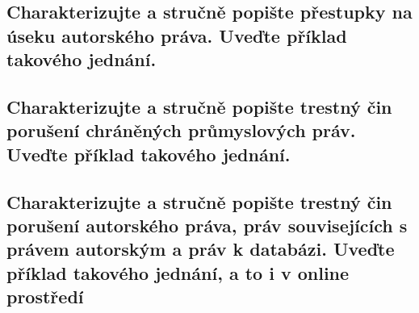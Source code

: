 \subsection{Charakterizujte a stručně popište přestupky na úseku autorského práva. Uveďte příklad takového jednání.}


\subsection{Charakterizujte a stručně popište trestný čin porušení chráněných průmyslových práv. Uveďte příklad takového jednání.}


\subsection{Charakterizujte a stručně popište trestný čin porušení autorského práva, práv souvisejících s právem autorským a práv k databázi. Uveďte příklad takového jednání, a to i v online prostředí}
